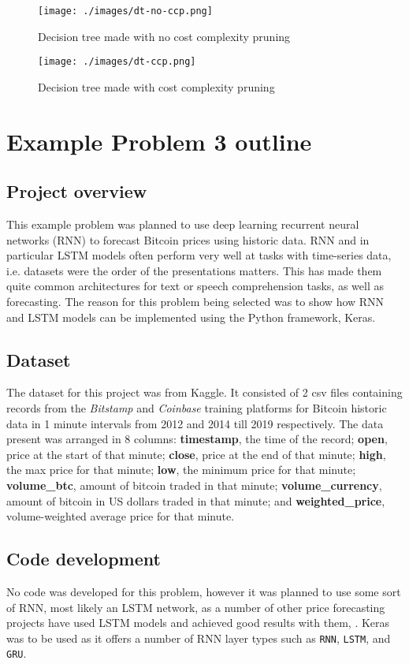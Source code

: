\documentclass[12pt,a4paper,titlepage,twoside]{report}
\begin{document}
	\begin{figure}[h]
		\centering
		\texttt{[image: ./images/dt-no-ccp.png]}
		\caption{Decision tree made with no cost complexity pruning}
		\label{fig:dt-no-ccp-full}
	\end{figure}
	
	\begin{figure}[h]
		\centering
		\texttt{[image: ./images/dt-ccp.png]}
		\caption{Decision tree made with cost complexity pruning}
		\label{fig:dt-ccp-full}
	\end{figure}

\chapter{Example Problem 3 outline}

\section*{Project overview}
	This example problem was planned to use deep learning recurrent neural networks (RNN) to forecast Bitcoin prices using historic data. RNN and in particular LSTM models often perform very well at tasks with time-series data, i.e. datasets were the order of the presentations matters. This has made them quite common architectures for text or speech comprehension tasks, as well as forecasting. The reason for this problem being selected was to show how RNN and LSTM models can be implemented using the Python framework, Keras.

\section*{Dataset}
	The dataset for this project was from Kaggle\cite{bitcoin-data}. It consisted of 2 csv files containing records from the \textit{Bitstamp} and \textit{Coinbase} training platforms for Bitcoin historic data in 1 minute intervals from 2012 and 2014 till 2019 respectively. The data present was arranged in 8 columns: \textbf{timestamp}, the time of the record; \textbf{open}, price at the start of that minute; \textbf{close}, price at the end of that minute; \textbf{high}, the max price for that minute; \textbf{low}, the minimum price for that minute; \textbf{volume_btc}, amount of bitcoin traded in that minute; \textbf{volume_currency}, amount of bitcoin in US dollars traded in that minute; and \textbf{weighted_price}, volume-weighted average price for that minute.
	
\section*{Code development}
	No code was developed for this problem, however it was planned to use some sort of RNN, most likely an LSTM network, as a number of other price forecasting projects have used LSTM models and achieved good results with them\cite{lstm-use-1}, \cite{lstm-use-2}. Keras was to be used as it offers a number of RNN layer types such as \texttt{RNN}, \texttt{LSTM}, and \texttt{GRU}.
	
\printbibliography
\end{document}
